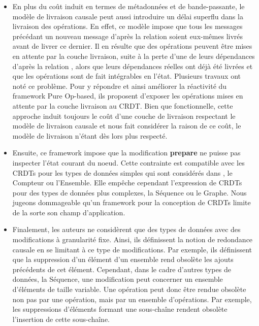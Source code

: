 \begin{itemize}
    \item En plus du coût induit en termes de métadonnées et de bande-passante, le modèle de livraison causale peut aussi introduire un délai superflu dans la livraison des opérations.
        En effet, ce modèle impose que tous les messages précédant un nouveau message d'après la relation \hb soient eux-mêmes livrés avant de livrer ce dernier.
        Il en résulte que des opérations peuvent être mises en attente par la couche livraison, \eg suite à la perte d'une de leurs dépendances d'après la relation \hb, alors que leurs dépendances réelles ont déjà été livrées et que les opérations sont de fait intégrables en l'état.
        Plusieurs travaux \cite{2020-flec-bauwens,2021-improving-reactivity-pure-op-based-crdts-bauwens} ont noté ce problème.
        Pour y répondre et ainsi améliorer la réactivité du framework Pure Op-based, ils proposent d'exposer les opérations mises en attente par la couche livraison au \ac{CRDT}.
        Bien que fonctionnelle, cette approche induit toujours le coût d'une couche de livraison respectant le modèle de livraison causale et nous fait considérer la raison de ce coût, le modèle de livraison n'étant dès lors plus respecté.
    \item Ensuite, ce framework impose que la modification \textbf{prepare} ne puisse pas inspecter l'état courant du noeud.
        Cette contrainte est compatible avec les \acp{CRDT} pour les types de données simples qui sont considérés dans \cite{baquero2017pure}, \eg le Compteur ou l'Ensemble.
        Elle empêche cependant l'expression de \acp{CRDT} pour des types de données plus complexes, \eg la Séquence ou le Graphe.
        Nous jugeons dommageable qu'un framework pour la conception de \acp{CRDT} limite de la sorte son champ d'application.
    \item Finalement, les auteurs ne considèrent que des types de données avec des modifications à granularité fixe.
        Ainsi, ils définissent la notion de redondance causale en se limitant à ce type de modifications.
        Par exemple, ils définissent que la suppression d'un élément d'un ensemble rend obsolète les ajouts précédents de cet élément.
        Cependant, dans le cadre d'autres types de données, \eg la Séquence, une modification peut concerner un ensemble d'éléments de taille variable.
        Une opération peut donc être rendue obsolète non pas par une opération, mais par un ensemble d'opérations.
        Par exemple, les suppressions d'éléments formant une sous-chaîne rendent obsolète l'insertion de cette sous-chaîne.

\end{itemize}
